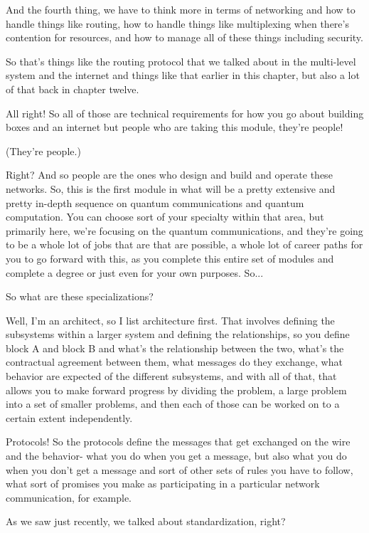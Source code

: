 \mmm And the fourth thing, we have to think more in terms of networking and how to handle things like routing, how to handle things like multiplexing when there's contention for resources, and how to manage all of these things including security.

\rrr So that's things like the routing protocol that we talked about in the multi-level system and the internet and things like that earlier in this chapter, but also a lot of that back in chapter twelve.

All right! So all of those are technical requirements for how you go about building boxes and an internet but people who are taking this module, they're people! 

\mmm (They're people.) 

\rrr Right? And so people are the ones who design and build and operate these networks. So, this is the first module in what will be a pretty extensive and pretty in-depth sequence on quantum communications and quantum computation. You can choose sort of your specialty within that area, but primarily here, we're focusing on the quantum communications, and they're going to be a whole lot of jobs that are that are possible, a whole lot of career paths for you to go forward with this, as you complete this entire set of modules and complete a degree or just even for your own purposes. So...

\mmm So what are these specializations?

\rrr Well, I'm an architect, so I list architecture first. That involves defining the subsystems within a larger system and defining the relationships, so you define block A and block B and what's the relationship between the two, what's the contractual agreement between them, what messages do they exchange, what behavior are expected of the different subsystems, and with all of that, that allows you to make forward progress by dividing the problem, a large problem into a set of smaller problems, and then each of those can be worked on to a certain extent independently.

Protocols! So the protocols define the messages that get exchanged on the wire and the behavior- what you do when you get a message, but also what you do when you don't get a message and sort of other sets of rules you have to follow, what sort of promises you make as participating in a particular network communication, for example.

As we saw just recently, we talked about standardization, right?

